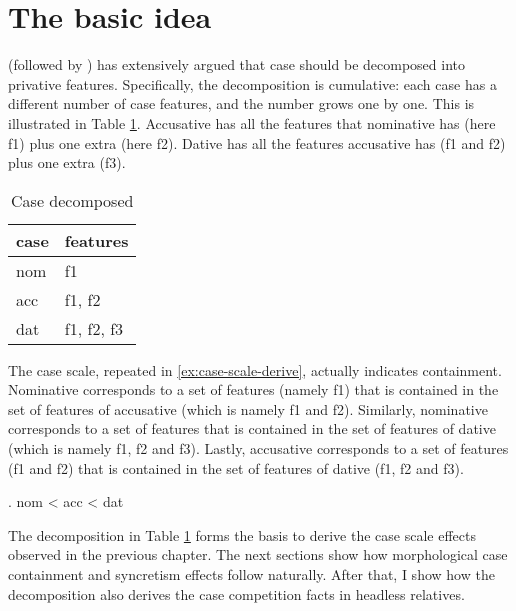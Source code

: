 \section{The basic idea}

\citet{caha2009,caha2013} (followed by \citealt[cf.][]{starke2009,bobaljik2012,mcfadden2018,smith2019,vanbaal2018}) has extensively argued that case should be decomposed into privative features. Specifically, the decomposition is cumulative: each case has a different number of case features, and the number grows one by one.
This is illustrated in Table \ref{tbl:case-decomposed}. Accusative has all the features that nominative has (here \ac{f}1) plus one extra (here \ac{f}2). Dative has all the features accusative has (\ac{f}1 and \ac{f}2) plus one extra (\ac{f}3).

\begin{table}[H]
  \center
	\caption {Case decomposed}
		\begin{tabular}{ll}
    \toprule
    case      & features                  \\
    \midrule
    \ac{nom} & \ac{f}1                    \\
    \ac{acc} & \ac{f}1, \ac{f}2           \\
    \ac{dat} & \ac{f}1, \ac{f}2, \ac{f}3  \\
    \bottomrule
    \end{tabular}
    \label{tbl:case-decomposed}
\end{table}

The case scale, repeated in \ref{ex:case-scale-derive}, actually indicates containment.
Nominative corresponds to a set of features (namely \ac{f}1) that is contained in the set of features of accusative (which is namely \ac{f}1 and \ac{f}2).
Similarly, nominative corresponds to a set of features that is contained in the set of features of dative (which is namely \ac{f}1, \ac{f}2 and \ac{f}3).
Lastly, accusative corresponds to a set of features (\ac{f}1 and \ac{f}2) that is contained in the set of features of dative (\ac{f}1, \ac{f}2 and \ac{f}3).

\ex. \ac{nom} < \ac{acc} < \ac{dat}\label{ex:case-scale-derive}

The decomposition in Table \ref{tbl:case-decomposed} forms the basis to derive the case scale effects observed in the previous chapter. The next sections show how morphological case containment and syncretism effects follow naturally. After that, I show how the decomposition also derives the case competition facts in headless relatives.


